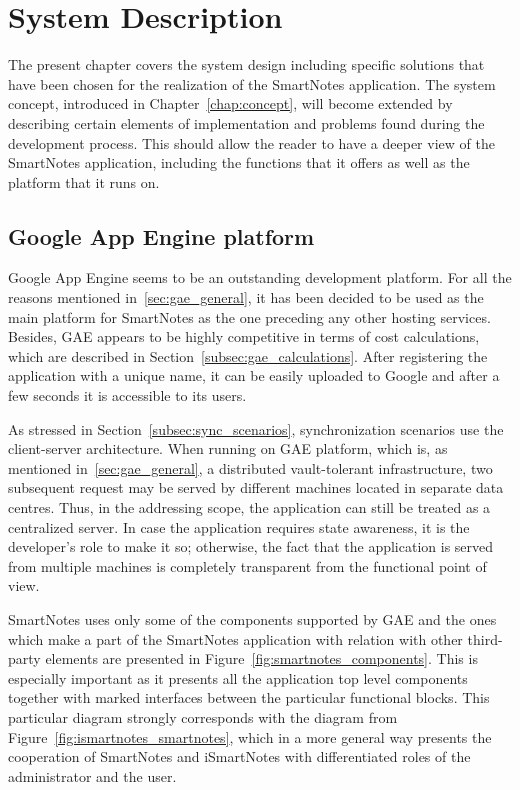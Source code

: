 \chapter{System Description}\label{chap:sys_description}
The present chapter covers the system design including specific solutions that have been chosen for the realization of the SmartNotes application. The system concept, introduced in Chapter~\ref{chap:concept}, will become extended by describing certain elements of implementation and problems found during the development process. This should allow the reader to have a deeper view of the SmartNotes application, including the functions that it offers as well as the platform that it runs on.
\section{Google App Engine platform}\label{sec:gae}
Google App Engine seems to be an outstanding development platform. For all the reasons mentioned in~\ref{sec:gae_general}, it has been decided to be used as the main platform for SmartNotes as the one preceding any other hosting services. Besides, GAE appears to be highly competitive in terms of cost calculations, which are described in Section~\ref{subsec:gae_calculations}. After registering the application with a unique name, it can be easily uploaded to Google and after a few seconds it is accessible to its users.
 
As stressed in Section~\ref{subsec:sync_scenarios}, synchronization scenarios use the client-server architecture. When running on GAE platform, which is, as mentioned in~\ref{sec:gae_general}, a distributed vault-tolerant infrastructure, two subsequent request may be served by different machines located in separate data centres. Thus, in the addressing scope, the application can still be treated as a centralized server. In case the application requires state awareness, it is the developer's role to make it so; otherwise, the fact that the application is served from multiple machines is completely transparent from the functional point of view.
 
SmartNotes uses only some of the components supported by GAE and the ones which make a part of the SmartNotes application with relation with other third-party elements are presented in Figure~\ref{fig:smartnotes_components}. This is especially important as it presents all the application top level components together with marked interfaces between the particular functional blocks. This particular diagram strongly corresponds with the diagram from Figure~\ref{fig:ismartnotes_smartnotes}, which in a more general way presents the cooperation of SmartNotes and iSmartNotes with differentiated roles of the administrator and the user.
 
